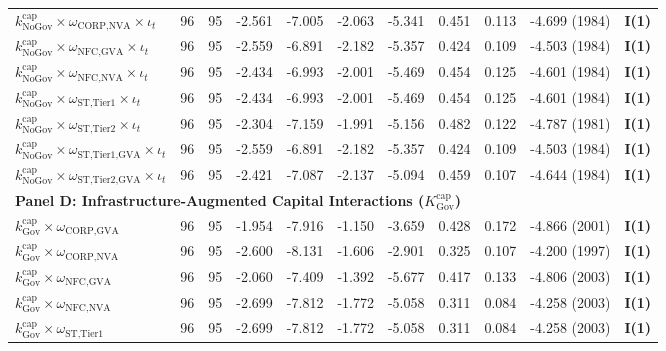 \documentclass[11pt,a4paper]{article}
\begin{document}
\begin{landscape}
\begin{table}[p]
\begin{tabular}{p{6.0cm} p{0.6cm} p{0.6cm} p{1.5cm} p{1.5cm} p{1.5cm} p{1.5cm} p{1.5cm} p{1.5cm} p{2.2cm} p{2.2cm}}
$k^{\text{cap}}_{\text{NoGov}} \times \omega_{\text{CORP,NVA}} \times \iota_t$ & 96 & 95 & -2.561 & -7.005 & -2.063 & -5.341 & 0.451 & 0.113 & -4.699 (1984) & \textbf{I(1)} \\
$k^{\text{cap}}_{\text{NoGov}} \times \omega_{\text{NFC,GVA}} \times \iota_t$ & 96 & 95 & -2.559 & -6.891 & -2.182 & -5.357 & 0.424 & 0.109 & -4.503 (1984) & \textbf{I(1)} \\
$k^{\text{cap}}_{\text{NoGov}} \times \omega_{\text{NFC,NVA}} \times \iota_t$ & 96 & 95 & -2.434 & -6.993 & -2.001 & -5.469 & 0.454 & 0.125 & -4.601 (1984) & \textbf{I(1)} \\
$k^{\text{cap}}_{\text{NoGov}} \times \omega_{\text{ST,Tier1}} \times \iota_t$ & 96 & 95 & -2.434 & -6.993 & -2.001 & -5.469 & 0.454 & 0.125 & -4.601 (1984) & \textbf{I(1)} \\
$k^{\text{cap}}_{\text{NoGov}} \times \omega_{\text{ST,Tier2}} \times \iota_t$ & 96 & 95 & -2.304 & -7.159 & -1.991 & -5.156 & 0.482 & 0.122 & -4.787 (1981) & \textbf{I(1)} \\
$k^{\text{cap}}_{\text{NoGov}} \times \omega_{\text{ST,Tier1,GVA}} \times \iota_t$ & 96 & 95 & -2.559 & -6.891 & -2.182 & -5.357 & 0.424 & 0.109 & -4.503 (1984) & \textbf{I(1)} \\
$k^{\text{cap}}_{\text{NoGov}} \times \omega_{\text{ST,Tier2,GVA}} \times \iota_t$ & 96 & 95 & -2.421 & -7.087 & -2.137 & -5.094 & 0.459 & 0.107 & -4.644 (1984) & \textbf{I(1)} \\
\midrule
\multicolumn{11}{l}{\textbf{Panel D: Infrastructure-Augmented Capital Interactions ($K^{\text{cap}}_{\text{Gov}}$)}} \\
\midrule
$k^{\text{cap}}_{\text{Gov}} \times \omega_{\text{CORP,GVA}}$ & 96 & 95 & -1.954 & -7.916 & -1.150 & -3.659 & 0.428 & 0.172 & -4.866 (2001) & \textbf{I(1)} \\
$k^{\text{cap}}_{\text{Gov}} \times \omega_{\text{CORP,NVA}}$ & 96 & 95 & -2.600 & -8.131 & -1.606 & -2.901 & 0.325 & 0.107 & -4.200 (1997) & \textbf{I(1)} \\
$k^{\text{cap}}_{\text{Gov}} \times \omega_{\text{NFC,GVA}}$ & 96 & 95 & -2.060 & -7.409 & -1.392 & -5.677 & 0.417 & 0.133 & -4.806 (2003) & \textbf{I(1)} \\
$k^{\text{cap}}_{\text{Gov}} \times \omega_{\text{NFC,NVA}}$ & 96 & 95 & -2.699 & -7.812 & -1.772 & -5.058 & 0.311 & 0.084 & -4.258 (2003) & \textbf{I(1)} \\
$k^{\text{cap}}_{\text{Gov}} \times \omega_{\text{ST,Tier1}}$ & 96 & 95 & -2.699 & -7.812 & -1.772 & -5.058 & 0.311 & 0.084 & -4.258 (2003) & \textbf{I(1)} \\

\end{tabular}
\end{table}
\end{landscape}
\end{document}
